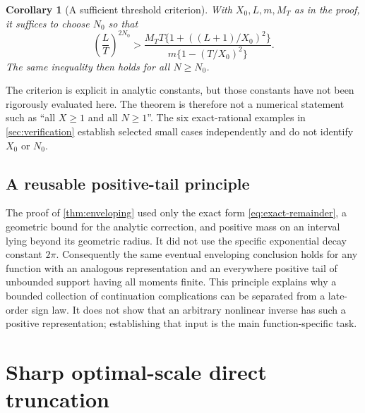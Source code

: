 \documentclass[11pt,a4paper]{article}
\newtheorem{corollary}[corollary]{Corollary}
\theoremstyle{definition}
\numberwithin{equation}{section}
\begin{document}
\begin{corollary}[A sufficient threshold criterion]
\label{cor:criterion}
With $X_0,L,m,M_T$ as in the proof, it suffices to choose $N_0$ so that
\begin{equation}
 \left(\frac LT\right)^{2N_0}
 >\frac{M_TT\{1+((L+1)/X_0)^2\}}
         {m\{1-(T/X_0)^2\}}.
 \label{eq:threshold}
\end{equation}
The same inequality then holds for all $N\ge N_0$.
\end{corollary}

The criterion is explicit in analytic constants, but those constants
have not been rigorously evaluated here. The theorem is therefore not a
numerical statement such as ``all $X\ge1$ and all $N\ge1$''. The six
exact-rational examples in \cref{sec:verification} establish selected
small cases independently and do not identify $X_0$ or $N_0$.

\subsection{A reusable positive-tail principle}
The proof of \cref{thm:enveloping} used only the exact form
\eqref{eq:exact-remainder}, a geometric bound for the analytic correction,
and positive mass on an interval lying beyond its geometric radius.
It did not use the specific exponential decay constant $2\pi$.
Consequently the same eventual enveloping conclusion holds for any
function with an analogous representation and an everywhere positive tail
of unbounded support having all moments finite. This principle explains
why a bounded collection of continuation complications can be separated
from a late-order sign law. It does not show that an arbitrary nonlinear
inverse has such a positive representation; establishing that input is
the main function-specific task.

\section{Sharp optimal-scale direct truncation}
\label{sec:sharp}
\end{document}
